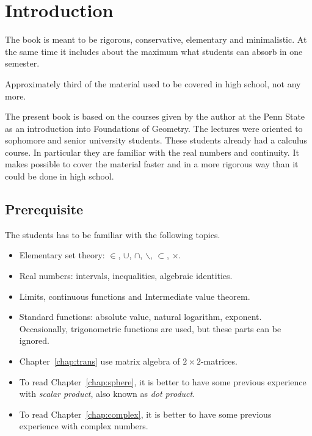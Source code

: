 \chapter*{Introduction}

The book is meant to be 
rigorous, 
conservative, 
elementary and
minimalistic.
At the same time it includes about the maximum what students can absorb in one semester.

Approximately third of the material used to be covered in high school, not any more.

The present book is based 
on the courses given by the author 
at the Penn State 
as an introduction into Foundations of Geometry.
The lectures were oriented to sophomore and senior university students.  
These students already had a calculus course.
In particular they are familiar with the real numbers and continuity.
It makes possible to cover the material faster 
and  in a more rigorous way
than it could be done in high school.



\section*{Prerequisite}

The students has to be familiar 
with the following topics.
\begin{itemize}
\item Elementary set theory: 
$\in$,
$\cup$, 
$\cap$,
$\backslash$,
$\subset$,
$\times$.
\item Real numbers: intervals, inequalities, algebraic identities.
\item Limits, continuous functions and  Intermediate value theorem.
\item Standard functions: 
absolute value, 
natural logarithm,
exponent. 
Occasionally, trigonometric functions  are used, 
but these parts can be ignored.
\item  Chapter~\ref{chap:trans} 
use matrix algebra of $2{\times}2$-matrices.
\item To read Chapter~\ref{chap:sphere}, it is better to have some previous experience with {}\emph{scalar product}, also known as {}\emph{dot product}.
\item To read Chapter~\ref{chap:complex}, it is better to have some previous experience with complex numbers.
\end{itemize} 

